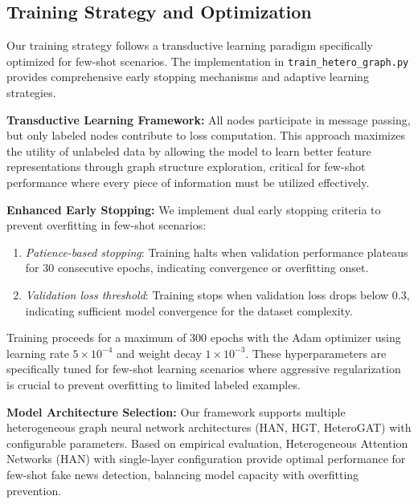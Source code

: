 \subsection{Training Strategy and Optimization}

Our training strategy follows a transductive learning paradigm specifically optimized for few-shot scenarios. The implementation in \texttt{train\_hetero\_graph.py} provides comprehensive early stopping mechanisms and adaptive learning strategies.

\textbf{Transductive Learning Framework:} All nodes participate in message passing, but only labeled nodes contribute to loss computation. This approach maximizes the utility of unlabeled data by allowing the model to learn better feature representations through graph structure exploration, critical for few-shot performance where every piece of information must be utilized effectively.

\textbf{Enhanced Early Stopping:} We implement dual early stopping criteria to prevent overfitting in few-shot scenarios:
\begin{enumerate}
\item \emph{Patience-based stopping}: Training halts when validation performance plateaus for 30 consecutive epochs, indicating convergence or overfitting onset.
\item \emph{Validation loss threshold}: Training stops when validation loss drops below 0.3, indicating sufficient model convergence for the dataset complexity.
\end{enumerate}

Training proceeds for a maximum of 300 epochs with the Adam optimizer using learning rate $5 \times 10^{-4}$ and weight decay $1 \times 10^{-3}$. These hyperparameters are specifically tuned for few-shot learning scenarios where aggressive regularization is crucial to prevent overfitting to limited labeled examples.

\textbf{Model Architecture Selection:} Our framework supports multiple heterogeneous graph neural network architectures (HAN, HGT, HeteroGAT) with configurable parameters. Based on empirical evaluation, Heterogeneous Attention Networks (HAN) with single-layer configuration provide optimal performance for few-shot fake news detection, balancing model capacity with overfitting prevention.

\EndChapter
